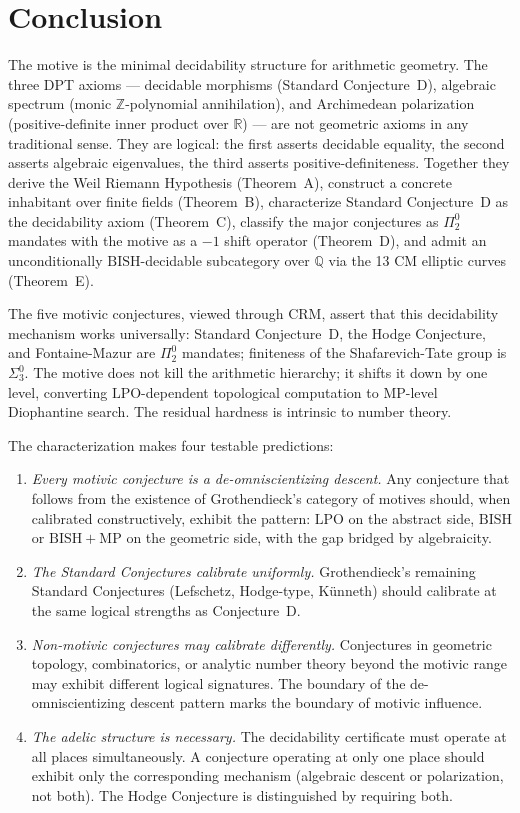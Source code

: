 \documentclass[11pt]{article}
\theoremstyle{definition}
\theoremstyle{remark}
\newcommand{\Z}{\mathbb{Z}}
\newcommand{\Q}{\mathbb{Q}}
\newcommand{\R}{\mathbb{R}}
\newcommand{\LPO}{\mathrm{LPO}}
\newcommand{\MP}{\mathrm{MP}}
\newcommand{\BISH}{\mathrm{BISH}}
\newcommand{\CRM}{\mathrm{CRM}}
\begin{document}
\section{Conclusion}
\label{sec:conclusion}

The motive is the minimal decidability structure for arithmetic geometry. The three DPT axioms --- decidable morphisms (Standard Conjecture~D), algebraic spectrum (monic $\Z$-polynomial annihilation), and Archimedean polarization (positive-definite inner product over $\R$) --- are not geometric axioms in any traditional sense. They are logical: the first asserts decidable equality, the second asserts algebraic eigenvalues, the third asserts positive-definiteness. Together they derive the Weil Riemann Hypothesis (Theorem~A), construct a concrete inhabitant over finite fields (Theorem~B), characterize Standard Conjecture~D as the decidability axiom (Theorem~C), classify the major conjectures as $\Pi_2^0$ mandates with the motive as a $-1$ shift operator (Theorem~D), and admit an unconditionally $\BISH$-decidable subcategory over $\Q$ via the 13 CM elliptic curves (Theorem~E).

The five motivic conjectures, viewed through $\CRM$, assert that this decidability mechanism works universally: Standard Conjecture~D, the Hodge Conjecture, and Fontaine-Mazur are $\Pi_2^0$ mandates; finiteness of the Shafarevich-Tate group is $\Sigma_3^0$. The motive does not kill the arithmetic hierarchy; it shifts it down by one level, converting $\LPO$-dependent topological computation to $\MP$-level Diophantine search. The residual hardness is intrinsic to number theory.

The characterization makes four testable predictions:
\begin{enumerate}
\item \emph{Every motivic conjecture is a de-omniscientizing descent.} Any conjecture that follows from the existence of Grothendieck's category of motives should, when calibrated constructively, exhibit the pattern: $\LPO$ on the abstract side, $\BISH$ or $\BISH + \MP$ on the geometric side, with the gap bridged by algebraicity.
\item \emph{The Standard Conjectures calibrate uniformly.} Grothendieck's remaining Standard Conjectures (Lefschetz, Hodge-type, K\"unneth) should calibrate at the same logical strengths as Conjecture~D.
\item \emph{Non-motivic conjectures may calibrate differently.} Conjectures in geometric topology, combinatorics, or analytic number theory beyond the motivic range may exhibit different logical signatures. The boundary of the de-omniscientizing descent pattern marks the boundary of motivic influence.
\item \emph{The adelic structure is necessary.} The decidability certificate must operate at all places simultaneously. A conjecture operating at only one place should exhibit only the corresponding mechanism (algebraic descent or polarization, not both). The Hodge Conjecture is distinguished by requiring both.
\end{enumerate}
\end{document}
